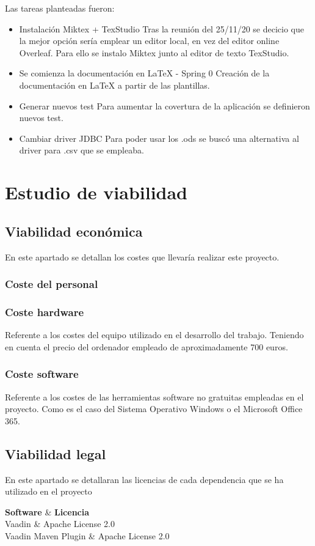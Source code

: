 Las tareas planteadas fueron:
\begin{itemize}
	\tightlist
	\item Instalación Miktex + TexStudio
		Tras la reunión del 25/11/20 se decicio que la mejor opción sería emplear un editor local, en vez del editor online Overleaf. Para ello se instalo Miktex junto al editor de texto TexStudio.
	\item Se comienza la documentación en LaTeX  - Spring 0
		Creación de la documentación en LaTeX a partir de las plantillas.
	\item Generar nuevos test
		Para aumentar la covertura de la aplicación se definieron nuevos test.
	\item Cambiar driver JDBC 
		Para poder usar los .ods se buscó una alternativa al driver para .csv que se empleaba.
\end{itemize}

\section{Estudio de viabilidad}
\subsection{Viabilidad económica}
En este apartado se detallan los costes que llevaría realizar este proyecto.

\subsubsection{Coste del personal}

\subsubsection{Coste hardware}
Referente a los costes del equipo utilizado en el desarrollo del trabajo. Teniendo en cuenta el precio del ordenador empleado de aproximadamente 700 euros.

\subsubsection{Coste software}
Referente a los costes de las herramientas software no gratuitas empleadas en el proyecto. Como es el caso del Sistema Operativo Windows o el Microsoft Office 365.

\subsection{Viabilidad legal}
En este apartado se detallaran las licencias de cada dependencia que se ha utilizado en el proyecto

{\textbf{Software} & \textbf{Licencia} \\}{
	Vaadin & Apache License 2.0 \\
	Vaadin Maven Plugin & Apache License 2.0 \\
}